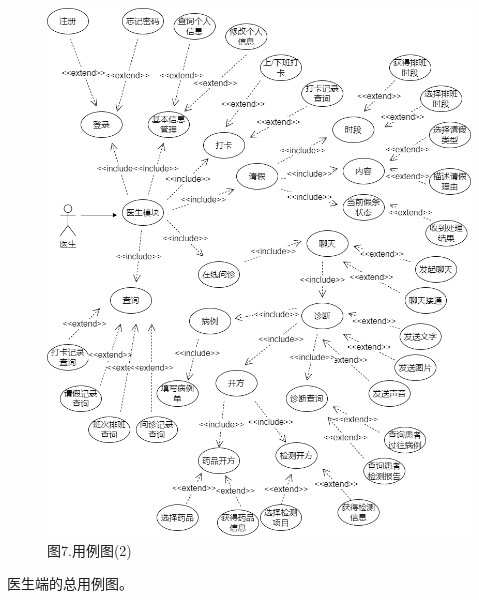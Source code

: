 \documentclass[24pt,a4paper]{article}%
\begin{document}
\begin{figure}[H]
    \centering
    \includegraphics[width=1\textwidth]{image/用例图(2).png}
    \caption*{图7.用例图(2)}
\end{figure}
医生端的总用例图。
\end{document}
